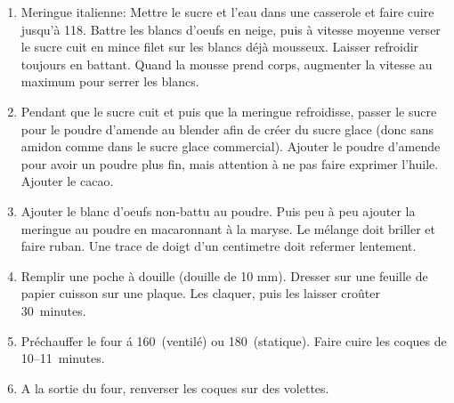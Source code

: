 

\begin{ingredients}
\end{ingredients}


\begin{recipe}
  \begin{enumerate}

  \item Meringue italienne:  Mettre le sucre et l'eau dans
    une casserole et faire cuire jusqu'\`a 118\C.  Battre les blancs d'oeufs
    en neige, puis \`a vitesse moyenne verser le sucre cuit en mince filet
    sur les blancs d\'ej\`a mousseux.  Laisser refroidir toujours en
    battant.  Quand la mousse prend corps, augmenter la vitesse au
    maximum pour serrer les blancs.

  \item Pendant que le sucre cuit et puis que la meringue refroidisse,
    passer le sucre pour le poudre d'amende au blender afin de cr\'eer
    du sucre glace (donc sans amidon comme dans le sucre glace
    commercial).  Ajouter le poudre d'amende pour avoir un poudre plus
    fin, mais attention \`a ne pas faire exprimer l'huile.  Ajouter le cacao.

  \item Ajouter le blanc d'oeufs non-battu au poudre.  Puis peu \`a
    peu ajouter la meringue au poudre en macaronnant \`a la maryse.
    Le m\'elange doit briller et faire ruban.  Une trace de doigt d'un
    centimetre doit refermer lentement.

  \item Remplir une poche \`a douille (douille de 10 mm).  Dresser sur
    une feuille de papier cuisson sur une plaque.  Les claquer, puis
    les laisser cro\^uter 30~minutes.

  \item Pr\'echauffer le four \'a 160\C\ (ventil\'e) ou 180\C\
    (statique).  Faire cuire les coques de 10--11~minutes.

  \item A la sortie du four, renverser les coques sur des volettes.

  \end{enumerate}
\end{recipe}


